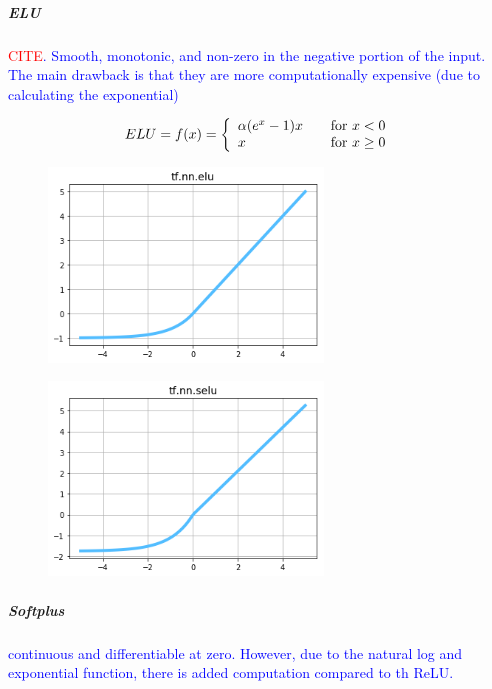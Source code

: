 \subparagraph{ELU}

\textcolor{blue}{\textcolor{red}{CITE}. Smooth, monotonic, and non-zero in the negative portion of the input. The main drawback is that they are more computationally expensive (due to calculating the exponential)}


\begin{equation}
{
	ELU = f(x) = \left\{
	\begin{array}{ll}
	\alpha(e^x - 1) x & \quad $for$ \ x < 0 \\
	x & \quad $for$ \ x \ge 0
	\end{array}
	\right.
}
\label{eq:act_elu_def}
\end{equation}


\begin{figure}
	\centering
	\includegraphics[width=0.65\textwidth]{./sync_imgs/act/smooth/elu.png}
	\label{fig:act_smooth_elu}
\end{figure}

\begin{figure}
	\centering
	\includegraphics[width=0.65\textwidth]{./sync_imgs/act/smooth/selu.png}
	\label{fig:act_smooth_selu}
\end{figure}


\subparagraph{Softplus}

\textcolor{blue}{continuous and differentiable at zero. However, due to the natural log and exponential function, there is added computation compared to th ReLU.}

